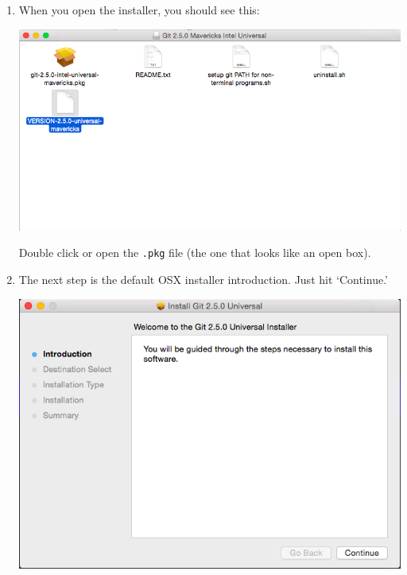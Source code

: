 \documentclass[11pt,fleqn]{article}
\theoremstyle{definition}
\begin{document}
\begin{enumerate}[Step 1.]
\item When you open the installer, you should see this:
\begin{center}
\includegraphics[scale=0.5]{gitmacinstall1.png}
\end{center}
Double click or open the \texttt{.pkg} file (the one that looks like an open box).

\newpage
\item The next step is the default OSX installer introduction. Just hit `Continue.'
\begin{center}
\includegraphics[scale=0.5]{gitmacinstall2.png}
\end{center}


\end{enumerate}
\end{document}
